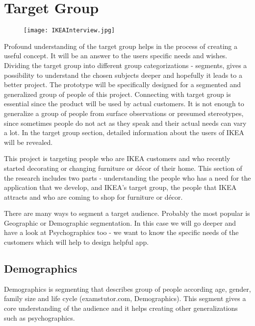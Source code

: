 \section{Target Group}
\begin{figure}[H]
\centering
\texttt{[image: IKEAInterview.jpg]}
\end{figure}
Profound understanding of the target group helps in the process of creating a useful concept. It will be an answer to the users specific needs and wishes. Dividing the target group into different group categorizations - segments, gives a possibility to understand the chosen subjects deeper and hopefully it leads to a better project. The prototype will be specifically designed for a segmented and generalized group of people of this project. Connecting with target group is essential since the product will be used by actual customers. It is not enough to generalize a group of people from surface observations or presumed stereotypes, since sometimes people do not act as they speak and their actual needs can vary a lot. In the target group section, detailed information about the users of IKEA will be revealed.

This project is targeting people who are IKEA customers and who recently started decorating or changing furniture or décor of their home. This section of the research includes two parts - understanding the people who has a need for the application that we develop, and IKEA's target group, the people that IKEA attracts and who are coming to shop for furniture or décor.

There are many ways to segment a target audience. Probably the most popular is Geographic or Demographic segmentation. In this case we will go deeper and have a look at Psychographics too - we want to know the specific needs of the customers which will help to design helpful app. 

\subsection{Demographics }
Demographics is segmenting that describes group of people according age, gender, family size and life cycle (examstutor.com, Demographics). This segment gives a core understanding of the audience and it helps creating other generalizations such as psychographics.

